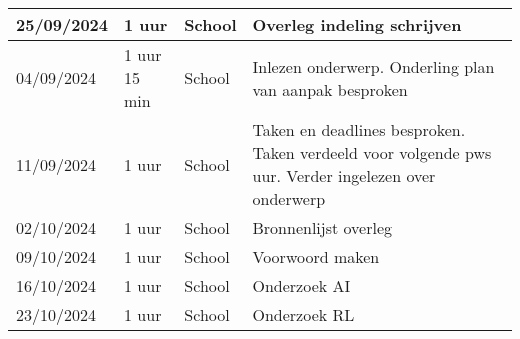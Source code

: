 \documentclass{article}
\begin{document}
\begin{longtable}{|p{}|p{}|p{}|p{}|}
    \hline
    25/09/2024     & 1 uur         & School          & Overleg indeling schrijven                                                                                                                                                                                                                                                                                           \\
    \hline
    04/09/2024     & 1 uur 15 min  & School          & Inlezen onderwerp. Onderling plan van aanpak besproken                                                                                                                                                                                                                                                               \\
    \hline
    11/09/2024     & 1 uur         & School          & Taken en deadlines besproken. Taken verdeeld voor volgende pws uur. Verder ingelezen over onderwerp                                                                                                                                                                                                                  \\
    \hline
    02/10/2024     & 1 uur         & School          & Bronnenlijst overleg                                                                                                                                                                                                                                                                                                 \\
    \hline
    09/10/2024     & 1 uur         & School          & Voorwoord maken                                                                                                                                                                                                                                                                                                      \\
    \hline
    16/10/2024     & 1 uur         & School          & Onderzoek AI                                                                                                                                                                                                                                                                                                         \\
    \hline
    23/10/2024     & 1 uur         & School          & Onderzoek RL                                                                                                                                                                                                                                                                                                         \\

\end{longtable}
\end{document}
